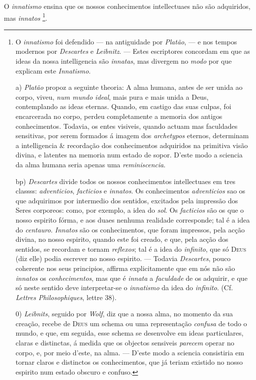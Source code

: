 
 
O \emph{innatismo} ensina que os nossos conhecimentos intellectuaes não são adquiridos, mas \emph{innatos} \footnote{O \emph{innatismo} foi defendido --- na antiguidade por \emph{Platão}, --- e nos tempos modernos por \emph{Descartes} e \emph{Leibnitz}. --- Estes escriptores concordam em que as ideas da nossa intelligencia são \emph{innatas}, mas divergem no \emph{modo} por que explicam este \emph{Innatismo}.\par a) \emph{Platão} propoz a seguinte theoria: A alma humana, antes de ser unida ao corpo, viveu, \emph{num mundo ideal}, mais pura e mais unida a Deus, contemplando as ideas eternas. Quando, em castigo das suas culpas, foi encarcerada no corpo, perdeu completamente a memoria dos antigos conhecimentos. Todavia, os entes visiveis, quando actuam mas faculdades sensitivas, por serem formados á imagem dos \emph{archetypos} eternos, determinam a intelligencia \& recordação dos conhecimentos adquiridos na primitiva visão divina, e latentes na memoria num estado de sopor. D'este modo a sciencia da alma humana seria apenas uma \emph{reminiscencia}.\par bp) \emph{Descartes} divide todos os nossos conhecimentos intellectuaes em tres classss: \emph{adventicios}, \emph{facticios} e \emph{innatos}. Os conhecimentos \emph{adventicios} sao os que adquirimos por intermedio dos sentidos, excitados pela impressão dos Seres corporeos: como, por exemplo, a idea do \emph{sol}. Os \emph{facticios} são os que o nosso espirito fórma, e aos duaes nenhuma realidade corresponde; tal é a idea do \emph{centauro}. \emph{Innatos} são os conhecimentos, que foram impressos, pela acção divina, no nosso espirito, quando este foi creado, e que, pela acção dos sentidos, se recordam e tornam \emph{reflexos}; tal é a idea do \emph{infinito}, que só \textsc{Deus} (diz elle) podia escrever no nosso espirito. --- Todavia \emph{Descartes}, pouco coherente nos seus principios, affirma explicitamente que em nós não são \emph{innatos} os \emph{conhecimentos}, mas que é \emph{innata} a \emph{faculdade} de os adquirir, e que só neste sentido deve interpretar-se o \emph{innatismo} da idea do \emph{infinito}. (Cf. \emph{Lettres Philosophiques}, lettre 38).\par 0) \emph{Leibnits}, seguido por \emph{Wolf}, diz que a nossa alma, no momento da sua creação, recebe de \textsc{Deus} um schema ou uma representação \emph{confusa} de todo o mundo, e que, em seguida, esse schema se desenvolve em ideas particulares, claras e distinctas, á medida que os objectos sensiveis \emph{parecem} operar no corpo, e, por meio d'este, na alma. --- D'este modo a sciencia consistiria em tornar claros e distinctos os conhecimentos, que já teriam existido no nosso espirito num estado obscuro e confuso.}.

